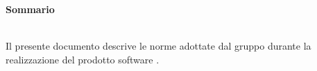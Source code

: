 \noindent\begin{Large}\textbf{Sommario}\end{Large}\\

\noindent Il presente documento descrive le norme adottate dal gruppo \gruppo{} durante la realizzazione del prodotto software \progetto{} .\\